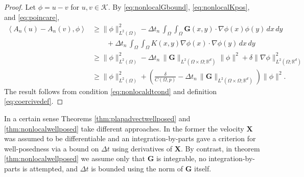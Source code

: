 \documentclass[final,onefignum]{siamart190516}
\newcommand\bG{\mathbf{G}}
\newcommand\bX{\mathbf{X}}
\newcommand{\grad}{\nabla}
\newcommand{\ip}[2]{\ensuremath{\left<#1,#2\right>}}
\newcommand\RR{\mathbb{R}}
\begin{document}
\begin{proof}  Let $\phi=u-v$ for $u,v\in\mathcal{K}$.  By \eqref{eq:nonlocalGbound}, \eqref{eq:nonlocalKpos}, and \eqref{eq:poincare},
\begin{align*}
\ip{A_n(u)-A_n(v)}{\phi} &\ge \|\phi\|_{L^2(\Omega)}^2 - \Delta t_n\,\int_\Omega \int_\Omega \bG(x,y) \cdot \grad \phi(x) \phi(y)\,dx\,dy \\
    &\qquad + \Delta t_n\,\int_\Omega \int_\Omega K(x,y) \grad \phi(x) \cdot \grad \phi(y)\,dx\,dy \\
    &\ge \|\phi\|_{L^2(\Omega)}^2 - \Delta t_n\,\|\bG\|_{L^2(\Omega\times\Omega;\RR^d)} \|\phi\|^2 + \delta \|\grad\phi\|_{L^2(\Omega;\RR^d)}^2 \\
    &\ge \|\phi\|_{L^2(\Omega)}^2 + \left(\frac{\delta}{C(\Omega,p)} - \Delta t_n\,\|\bG\|_{L^2(\Omega\times\Omega;\RR^d)}\right) \|\phi\|^2.
\end{align*}
The result follows from condition \eqref{eq:nonlocaldtcond} and definition \eqref{eq:coercivedef}.
\end{proof}

In a certain sense Theorems \ref{thm:plapadvectwellposed} and \ref{thm:nonlocalwellposed} take different approaches.  In the former the velocity $\bX$ was assumed to be differentiable and an integration-by-parts gave a criterion for well-posedness via a bound on $\Delta t$ using derivatives of $\bX$.  By contrast, in theorem \ref{thm:nonlocalwellposed} we assume only that $\bG$ is integrable, no integration-by-parts is attempted, and $\Delta t$ is bounded using the norm of $\bG$ itself.
\end{document}
